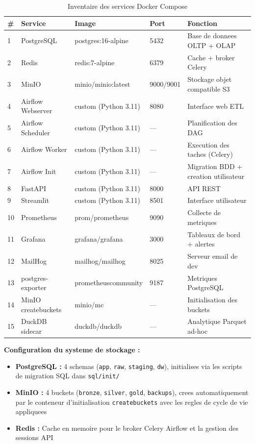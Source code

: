 \documentclass[a4paper,11pt,oneside,openany]{report}
\begin{document}
\begin{table}[H]
\centering
\caption{Inventaire des services Docker Compose}
\label{tab:services}
\begin{tabularx}{\textwidth}{C{0.5cm} L{3cm} L{2.5cm} C{1.5cm} L{4.5cm}}
\toprule
\textbf{\#} & \textbf{Service} & \textbf{Image} & \textbf{Port} & \textbf{Fonction} \\
 & PostgreSQL & postgres:16-alpine & 5432 & Base de donnees OLTP + OLAP \\
2 & Redis & redis:7-alpine & 6379 & Cache + broker Celery \\
3 & MinIO & minio/minio:latest & 9000/9001 & Stockage objet compatible S3 \\
4 & Airflow Webserver & custom (Python 3.11) & 8080 & Interface web ETL \\
5 & Airflow Scheduler & custom (Python 3.11) & --- & Planification des DAG \\
6 & Airflow Worker & custom (Python 3.11) & --- & Execution des taches (Celery) \\
7 & Airflow Init & custom (Python 3.11) & --- & Migration BDD + creation utilisateur \\
8 & FastAPI & custom (Python 3.11) & 8000 & API REST \\
9 & Streamlit & custom (Python 3.11) & 8501 & Interface utilisateur \\
10 & Prometheus & prom/prometheus & 9090 & Collecte de metriques \\
11 & Grafana & grafana/grafana & 3000 & Tableaux de bord + alertes \\
12 & MailHog & mailhog/mailhog & 8025 & Serveur email de dev \\
13 & postgres-exporter & prometheuscommunity & 9187 & Metriques PostgreSQL \\
14 & MinIO createbuckets & minio/mc & --- & Initialisation des buckets \\
15 & DuckDB sidecar & duckdb/duckdb & --- & Analytique Parquet ad-hoc \\
\bottomrule
\end{tabularx}
\end{table}

\textbf{Configuration du systeme de stockage :}
\begin{itemize}[nosep]
  \item \textbf{PostgreSQL :} 4 schemas (\texttt{app}, \texttt{raw}, \texttt{staging},
        \texttt{dw}), initialises via les scripts de migration SQL dans \texttt{sql/init/}
  \item \textbf{MinIO :} 4 buckets (\texttt{bronze}, \texttt{silver}, \texttt{gold},
        \texttt{backups}), crees automatiquement par le conteneur d'initialisation
        \texttt{createbuckets} avec les regles de cycle de vie appliquees
  \item \textbf{Redis :} Cache en memoire pour le broker Celery Airflow et la
        gestion des sessions API
\end{itemize}
\end{document}
